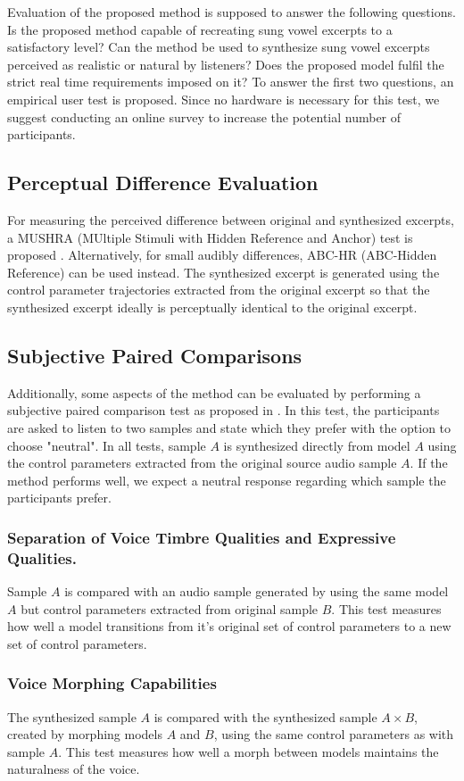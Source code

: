 Evaluation of the proposed method is supposed to answer the following questions. Is the proposed method capable of recreating sung vowel excerpts to a satisfactory level? Can the method be used to synthesize sung vowel excerpts perceived as realistic or natural by listeners? Does the proposed model fulfil the strict real time requirements imposed on it? To answer the first two questions, an empirical user test is proposed. Since no hardware is necessary for this test, we suggest conducting an online survey to increase the potential number of participants. 

\subsection{Perceptual Difference Evaluation}

For measuring the perceived difference between original and synthesized excerpts, a MUSHRA (MUltiple Stimuli with Hidden Reference and Anchor) \cite{itu-r_recommendation_bs.1534_method_2003} test is proposed \cite{morise_cheaptrick_2015}\cite{morise_world:_2016}\cite{blaauw_neural_2017-1}. Alternatively, for small audibly differences, ABC-HR (ABC-Hidden Reference) \cite{itu-r_recommendation_bs.1534_method_2003} can be used instead. The synthesized excerpt is generated using the control parameter trajectories extracted from the original excerpt so that  the synthesized excerpt ideally is perceptually identical to the original excerpt. 

\subsection{Subjective Paired Comparisons}

Additionally, some aspects of the method can be evaluated by performing a subjective paired comparison test as proposed in \cite{oord_wavenet:_2016}. In this test, the participants are asked to listen to two samples and state which they prefer with the option to choose "neutral". In all tests, sample $A$ is synthesized directly from model $A$ using the control parameters extracted from the original source audio sample $A$. If the method performs well, we expect a neutral response regarding which sample the participants prefer.

\subsubsection*{Separation of Voice Timbre Qualities and Expressive Qualities.}
Sample $A$ is compared with an audio sample generated by using the same model $A$ but control parameters extracted from original sample $B$. This test measures how well a model transitions from it's original set of control parameters to a new set of control parameters.  
\subsubsection*{Voice Morphing Capabilities}
The synthesized sample $A$ is compared with the synthesized sample $A \times B$, created by morphing models $A$ and $B$, using the same control parameters as with sample $A$. This test measures how well a morph between models maintains the naturalness of the voice.
